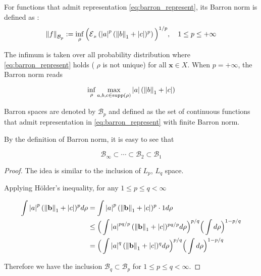 \begin{definition} For functions that admit representation
    \eqref{eq:barron_represent}, its Barron norm is defined as
    \cite{eBarronSpaceFlowinduced2021}:
    \begin{equation}\label{eq:barron_norm}
        \barronnorm{f}{p} := \inf_{\rho} \Big(\ERWi{\mu}{\abs{a}^p 
        (\norm{b}_1 + \abs{c})^p}\Big)^{1/p},
        \quad 1 \leq p \leq +\infty
    \end{equation}
\end{definition}

The infimum is taken over all probability distribution where
\eqref{eq:barron_represent} holds ( $\rho$ is not unique) for all
$\mathbf{x} \in X$. When $p = + \infty$, the Barron norm reads

\begin{equation}
    \inf_{\rho} \max_{a, b, c \in \operatorname{supp}(\rho)} \left| a \right| (\left\| b \right\|_1 + \left| c \right|)
\end{equation}

Barron spaces are denoted by $\mathcal{B}_p$ and defined as the set of
\textit{}{continuous} functions that admit representation in
\eqref{eq:barron_represent} with finite Barron norm.

By the definition of Barron norm, it is easy to see that

\begin{equation}
    \mathcal{B}_{\infty} \subset \cdots \subset \mathcal{B}_{2} \subset \mathcal{B}_1
\end{equation}


\begin{proof}

The idea is similar to the inclusion of $L_p$, $L_q$ space.

Applying Hölder's inequality, for any $1 \leq p \leq q < \infty$

\begin{align*}
    \int \left| a \right|^p (\left\| \mathbf{b} \right\|_1 + \left| c \right|)^p d\rho
     & = \int \left| a \right|^p (\left\| \mathbf{b} \right\|_1 + \left| c \right|)^p \cdot 1 d\rho                                                    \\
     & \leq \Big(\int \left| a \right|^{pq/p} (\left\| \mathbf{b} \right\|_1 + \left| c \right|)^{pq/p} d\rho \Big)^{p/q} \Big(\int d\rho\Big)^{1-p/q} \\
     & = \Big(\int \left| a \right|^q (\left\| \mathbf{b} \right\|_1 + \left| c \right|)^q d\rho \Big)^{p/q} \Big(\int d\rho\Big)^{1-p/q}
\end{align*}

Therefore we have the inclusion $\mathcal{B}_{q} \subset \mathcal{B}_p$ for $1
    \leq p \leq q < \infty$. 
\end{proof}

